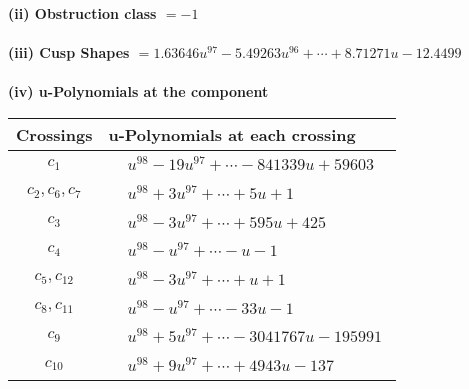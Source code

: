 \documentclass[1p]{elsarticle_modified}
\theoremstyle{definition}
\begin{document}
\flushleft \textbf{(ii) Obstruction class $= -1$}\\~\\
\flushleft \textbf{(iii) Cusp Shapes $= 1.63646 u^{97}-5.49263 u^{96}+\cdots+8.71271 u-12.4499$}\\~\\
\newpage\renewcommand{\arraystretch}{1}
\flushleft \textbf{(iv) u-Polynomials at the component}\newline \\
\begin{tabular}{m{50pt}|m{274pt}}
Crossings & \hspace{64pt}u-Polynomials at each crossing \\
\hline $$\begin{aligned}c_{1}\end{aligned}$$&$\begin{aligned}
&u^{98}-19 u^{97}+\cdots-841339 u+59603
\end{aligned}$\\
\hline $$\begin{aligned}c_{2},c_{6},c_{7}\end{aligned}$$&$\begin{aligned}
&u^{98}+3 u^{97}+\cdots+5 u+1
\end{aligned}$\\
\hline $$\begin{aligned}c_{3}\end{aligned}$$&$\begin{aligned}
&u^{98}-3 u^{97}+\cdots+595 u+425
\end{aligned}$\\
\hline $$\begin{aligned}c_{4}\end{aligned}$$&$\begin{aligned}
&u^{98}- u^{97}+\cdots- u-1
\end{aligned}$\\
\hline $$\begin{aligned}c_{5},c_{12}\end{aligned}$$&$\begin{aligned}
&u^{98}-3 u^{97}+\cdots+u+1
\end{aligned}$\\
\hline $$\begin{aligned}c_{8},c_{11}\end{aligned}$$&$\begin{aligned}
&u^{98}- u^{97}+\cdots-33 u-1
\end{aligned}$\\
\hline $$\begin{aligned}c_{9}\end{aligned}$$&$\begin{aligned}
&u^{98}+5 u^{97}+\cdots-3041767 u-195991
\end{aligned}$\\
\hline $$\begin{aligned}c_{10}\end{aligned}$$&$\begin{aligned}
&u^{98}+9 u^{97}+\cdots+4943 u-137
\end{aligned}$\\
\hline
\end{tabular}\\~\\
\end{document}
